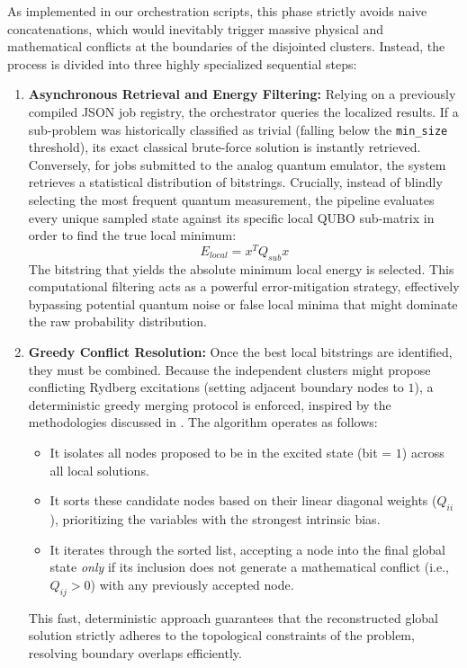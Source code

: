 As implemented in our orchestration scripts, this phase strictly avoids naive concatenations, which would inevitably trigger massive physical and mathematical conflicts at the boundaries of the disjointed clusters. Instead, the process is divided into three highly specialized sequential steps:

\begin{enumerate}
    \item \textbf{Asynchronous Retrieval and Energy Filtering:} 
    Relying on a previously compiled JSON job registry, the orchestrator queries the localized results. If a sub-problem was historically classified as trivial (falling below the \texttt{min\_size} threshold), its exact classical brute-force solution is instantly retrieved. Conversely, for jobs submitted to the analog quantum emulator, the system retrieves a statistical distribution of bitstrings. 
    Crucially, instead of blindly selecting the most frequent quantum measurement, the pipeline evaluates every unique sampled state against its specific local QUBO sub-matrix in order to find the true local minimum:
    \begin{equation}
        E_{local} = x^T Q_{sub} x
    \end{equation}
    The bitstring that yields the absolute minimum local energy is selected. This computational filtering acts as a powerful error-mitigation strategy, effectively bypassing potential quantum noise or false local minima that might dominate the raw probability distribution.

    \item \textbf{Greedy Conflict Resolution:} 
    Once the best local bitstrings are identified, they must be combined. Because the independent clusters might propose conflicting Rydberg excitations (setting adjacent boundary nodes to $1$), a deterministic greedy merging protocol is enforced, inspired by the methodologies discussed in \cite{das2025grid}. The algorithm operates as follows:
    \begin{itemize}
        \item It isolates all nodes proposed to be in the excited state (bit = $1$) across all local solutions.
        \item It sorts these candidate nodes based on their linear diagonal weights ($Q_{ii}$), prioritizing the variables with the strongest intrinsic bias.
        \item It iterates through the sorted list, accepting a node into the final global state \textit{only} if its inclusion does not generate a mathematical conflict (i.e., $Q_{ij} > 0$) with any previously accepted node.
    \end{itemize}
    This fast, deterministic approach guarantees that the reconstructed global solution strictly adheres to the topological constraints of the problem, resolving boundary overlaps efficiently.


\end{enumerate}
